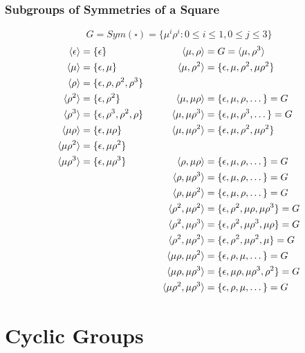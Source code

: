 \documentclass[openany]{report}
\begin{document}
\subsection{Subgroups of Symmetries of a Square}
$$G = Sym(\square) = \{\mu^i\rho^i : 0 \leq i \leq 1, 0 \leq j \leq 3\}$$
\begin{align*}
    \langle \epsilon \rangle &= \{\epsilon\} &&& \langle \mu,\rho \rangle &= G = \langle \mu,\rho^3 \rangle\\
    \langle \mu \rangle &= \{\epsilon,\mu\} &&& \langle \mu, \rho^2 \rangle &= \{\epsilon, \mu, \rho^2, \mu\rho^2\}\\
    \langle \rho \rangle &= \{\epsilon, \rho,\rho^2,\rho^3\}\\
    \langle \rho^2 \rangle &= \{\epsilon,\rho^2\} &&& \langle \mu, \mu\rho \rangle &=\{\epsilon, \mu, \rho, \dots\} = G\\
    \langle \rho^3 \rangle &= \{\epsilon, \rho^3, \rho^2,\rho\} &&& \langle \mu, \mu\rho^3 \rangle &=\{\epsilon, \mu, \rho^3, \dots\} = G\\
    \langle \mu\rho \rangle &= \{\epsilon, \mu\rho\} &&& \langle \mu, \mu\rho^2 \rangle &= \{\epsilon, \mu, \rho^2, \mu\rho^2\}\\
    \langle \mu\rho^2 \rangle &= \{\epsilon, \mu\rho^2\}\\
    \langle \mu\rho^3 \rangle &= \{\epsilon, \mu\rho^3\} &&& \langle \rho, \mu\rho \rangle &= \{\epsilon, \mu, \rho, \dots\} = G\\
    & &&& \langle \rho, \mu\rho^3 \rangle &= \{\epsilon, \mu, \rho, \dots\} = G\\
    & &&& \langle \rho, \mu\rho^2 \rangle &= \{\epsilon, \mu, \rho, \dots\} = G\\
    & &&& \langle \rho^2, \mu\rho^2 \rangle &= \{\epsilon, \rho^2, \mu\rho,\mu\rho^3\} = G\\
    & &&& \langle \rho^2, \mu\rho^3 \rangle &= \{\epsilon, \rho^2, \mu\rho^3,\mu\rho\} = G\\
    & &&& \langle \rho^2, \mu\rho^2 \rangle &= \{\epsilon, \rho^2, \mu\rho^2,\mu\} = G\\
    & &&& \langle \mu\rho, \mu\rho^2 \rangle &= \{\epsilon, \rho, \mu,\dots\} = G\\
    & &&& \langle \mu\rho, \mu\rho^3 \rangle &= \{\epsilon, \mu\rho, \mu\rho^3,\rho^2\} = G\\
    & &&& \langle \mu\rho^2, \mu\rho^3 \rangle &= \{\epsilon, \rho, \mu,\dots\} = G\\
\end{align*}

\chapter{Cyclic Groups}
\end{document}
